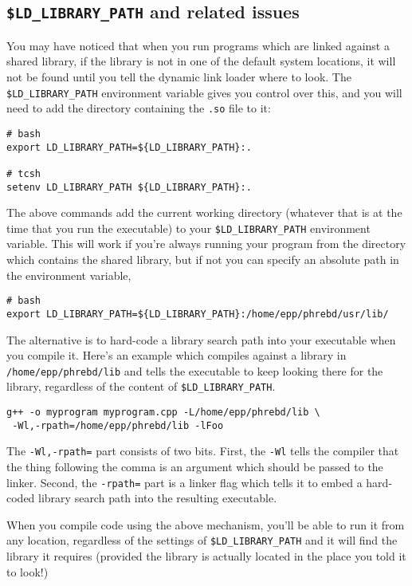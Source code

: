 \documentclass[a4paper]{scrartcl}
\begin{document}
\subsection{\texttt{\$LD\_LIBRARY\_PATH} and related issues}
You may have noticed that when you run programs which are linked against a shared library, if the library is not in one of the default system locations, it will not be found until you tell the dynamic link loader where to look. The \verb|$LD_LIBRARY_PATH| environment variable gives you control over this, and you will need to add the directory containing the \verb|.so| file to it:
\begin{verbatim}
# bash
export LD_LIBRARY_PATH=${LD_LIBRARY_PATH}:.

# tcsh
setenv LD_LIBRARY_PATH ${LD_LIBRARY_PATH}:.
\end{verbatim}

The above commands add the current working directory (whatever that is at the time that you run the executable) to your \verb|$LD_LIBRARY_PATH| environment variable. This will work if you're always running your program from the directory which contains the shared library, but if not you can specify an absolute path in the environment variable,
\begin{verbatim}
# bash
export LD_LIBRARY_PATH=${LD_LIBRARY_PATH}:/home/epp/phrebd/usr/lib/
\end{verbatim}

The alternative is to hard-code a library search path into your executable when you compile it. Here's an example which compiles against a library in \verb|/home/epp/phrebd/lib| and tells the executable to keep looking there for the library, regardless of the content of \verb|$LD_LIBRARY_PATH|.
\begin{verbatim}
g++ -o myprogram myprogram.cpp -L/home/epp/phrebd/lib \
 -Wl,-rpath=/home/epp/phrebd/lib -lFoo
\end{verbatim}

The \verb|-Wl,-rpath=| part consists of two bits. First, the \verb|-Wl| tells the compiler that the thing following the comma is an argument which should be passed to the linker. Second, the \verb|-rpath=| part is a linker flag which tells it to embed a hard-coded library search path into the resulting executable.

When you compile code using the above mechanism, you'll be able to run it from any location, regardless of the settings of \verb|$LD_LIBRARY_PATH| and it will find the library it requires (provided the library is actually located in the place you told it to look!)
\end{document}
